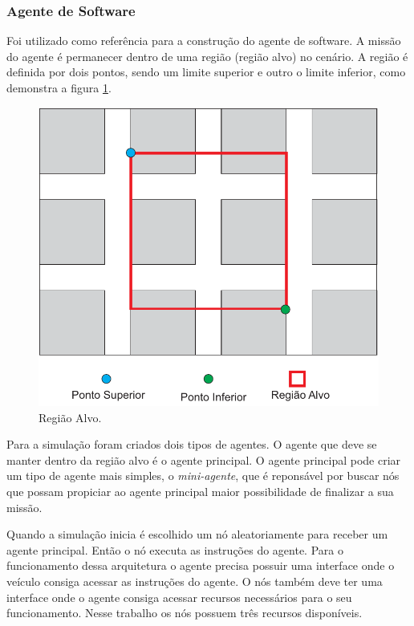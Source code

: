 \subsubsection{Agente de Software}

Foi utilizado \cite{Freitas:2011} como referência para a construção do agente de software. A missão do agente é permanecer dentro de uma região (região alvo) no cenário. A região é definida por dois pontos, sendo um limite superior e outro o limite inferior, como demonstra a figura \ref{fig:regiaoAlvo}. 

\begin{figure}[htbp]
	\centering
	\includegraphics[scale=0.7]{metodologia/figuras/regiaoAlvo.pdf}
	\caption{Região Alvo.}
	\label{fig:regiaoAlvo}
\end{figure}

Para a simulação foram criados dois tipos de agentes. O agente que deve se manter dentro da região alvo é o agente principal. O agente principal pode criar um tipo de agente mais simples, o \emph{mini-agente}, que é reponsável por buscar nós que possam propiciar ao agente principal maior possibilidade de finalizar a sua missão.

Quando a simulação inicia é escolhido um nó aleatoriamente para receber um agente principal. Então o nó executa as instruções do agente. Para o funcionamento dessa arquitetura o agente precisa possuir uma interface onde o veículo consiga acessar as instruções do agente. O nós também deve ter uma interface onde o agente consiga acessar recursos necessários para o seu funcionamento. Nesse trabalho os nós possuem três recursos disponíveis.

